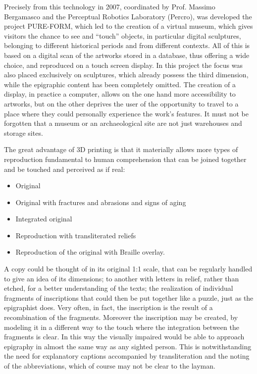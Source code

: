 \documentclass[amsthm,ebook]{saparticle}
\begin{document}
Precisely from this technology in 2007, coordinated by Prof. Massimo Bergamasco and the Perceptual Robotics Laboratory
(Percro), was developed the project PURE-FORM, which led to the creation of a virtual museum, which gives visitors the
chance to see and ``touch'' objects, in particular digital sculptures, belonging to different historical periods and from
different contexts. All of this is based on a digital scan of the artworks stored in a database, thus offering a wide
choice, and reproduced on a touch screen display. In this project the focus was also placed exclusively on sculptures,
which already possess the third dimension, while the epigraphic content has been completely omitted. The creation of a
display, in practice a computer, allows on the one hand more accessibility to artworks, but on the other deprives the
user of the opportunity to travel to a place where they could personally experience the work’s features. It must not be
forgotten that a museum or an archaeological site are not just warehouses and storage sites.

The great advantage of 3D printing is that it materially allows more types of reproduction fundamental to human
comprehension that can be joined together and be touched and perceived as if real:

\begin{itemize}
\item Original

\item Original with fractures and abrasions and signs of aging

\item Integrated original

\item Reproduction with transliterated reliefs

\item Reproduction of the original with Braille overlay.
\end{itemize}


A copy could be thought of in its original 1:1 scale, that can be regularly handled to give an idea of its dimensions;
to another with letters in relief, rather than etched, for a better understanding of the texts; the realization of
individual fragments of inscriptions that could then be put together like a puzzle, just as the epigraphist does. Very
often, in fact, the inscription is the result of a recombination of the fragments. Moreover the inscription may be
created, by modeling it in a different way to the touch where the integration between the fragments is clear. In this
way the visually impaired would be able to approach epigraphy in almost the same way as any sighted person. This is
notwithstanding the need for explanatory captions accompanied by transliteration and the noting of the abbreviations,
which of course may not be clear to the layman.
\end{document}
